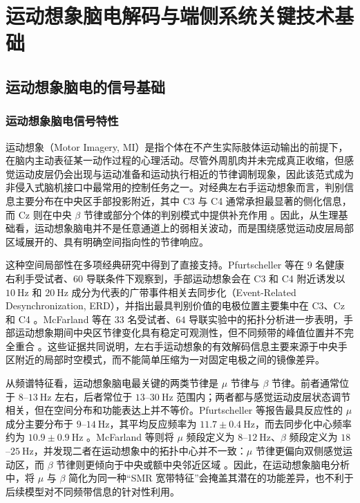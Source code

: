 \chapter{运动想象脑电解码与端侧系统关键技术基础}
\label{cha:background}

\section{运动想象脑电的信号基础}
\subsection{运动想象脑电信号特性}

运动想象（Motor Imagery, MI）是指个体在不产生实际肢体运动输出的前提下，在脑内主动表征某一动作过程的心理活动。尽管外周肌肉并未完成真正收缩，但感觉运动皮层仍会出现与运动准备和运动执行相近的节律调制现象，因此该范式成为非侵入式脑机接口中最常用的控制任务之一。对经典左右手运动想象而言，判别信息主要分布在中央区手部投影附近，其中 C3 与 C4 通常承担最显著的侧化信息，而 Cz 则在中央 $\beta$ 节律或部分个体的判别模式中提供补充作用 \cite{Pfu06,Mcf04}。因此，从生理基础看，运动想象脑电并不是任意通道上的弱相关波动，而是围绕感觉运动皮层局部区域展开的、具有明确空间指向性的节律响应。

这种空间局部性在多项经典研究中得到了直接支持。Pfurtscheller 等在 $9$ 名健康右利手受试者、$60$ 导联条件下观察到，手部运动想象会在 C3 和 C4 附近诱发以 $10\ \text{Hz}$ 和 $20\ \text{Hz}$ 成分为代表的广带事件相关去同步化（Event-Related Desynchronization, ERD），并指出最具判别价值的电极位置主要集中在 C3、Cz 和 C4 \cite{Pfu06}。McFarland 等在 $33$ 名受试者、$64$ 导联实验中的拓扑分析进一步表明，手部运动想象期间中央区节律变化具有稳定可观测性，但不同频带的峰值位置并不完全重合 \cite{Mcf04}。这些证据共同说明，左右手运动想象的有效解码信息主要来源于中央手区附近的局部时空模式，而不能简单压缩为一对固定电极之间的镜像差异。

从频谱特征看，运动想象脑电最关键的两类节律是 $\mu$ 节律与 $\beta$ 节律。前者通常位于 $8$--$13\ \text{Hz}$ 左右，后者常位于 $13$--$30\ \text{Hz}$ 范围内；两者都与感觉运动皮层状态调节相关，但在空间分布和功能表达上并不等价。Pfurtscheller 等报告最具反应性的 $\mu$ 成分主要分布于 $9$--$14\ \text{Hz}$，其平均反应频率为 $11.7 \pm 0.4\ \text{Hz}$，而去同步化中心频率约为 $10.9 \pm 0.9\ \text{Hz}$ \cite{Pfu06}。McFarland 等则将 $\mu$ 频段定义为 $8$--$12\ \text{Hz}$、$\beta$ 频段定义为 $18$--$25\ \text{Hz}$，并发现二者在运动想象中的拓扑中心并不一致：$\mu$ 节律更偏向双侧感觉运动区，而 $\beta$ 节律则更倾向于中央或额中央邻近区域 \cite{Mcf04}。因此，在运动想象脑电分析中，将 $\mu$ 与 $\beta$ 简化为同一种“SMR 宽带特征”会掩盖其潜在的功能差异，也不利于后续模型对不同频带信息的针对性利用。

